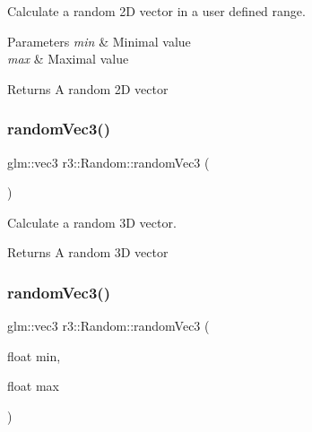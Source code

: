 Calculate a random 2D vector in a user defined range. 


\begin{DoxyParams}{Parameters}
{\em min} & Minimal value \\
\hline
{\em max} & Maximal value \\
\hline
\end{DoxyParams}
\begin{DoxyReturn}{Returns}
A random 2D vector 
\end{DoxyReturn}
\mbox{\label{classr3_1_1_random_a1819bc51a8924a8cbc4f8b2fc99d9a95}} 
\subsubsection{\texorpdfstring{random\+Vec3()}{randomVec3()}\hspace{0.1cm}{\footnotesize\ttfamily [1/3]}}
{\footnotesize\ttfamily glm\+::vec3 r3\+::\+Random\+::random\+Vec3 (\begin{DoxyParamCaption}{ }\end{DoxyParamCaption})\hspace{0.3cm}{\ttfamily [static]}}



Calculate a random 3D vector. 

\begin{DoxyReturn}{Returns}
A random 3D vector 
\end{DoxyReturn}
\mbox{\label{classr3_1_1_random_a85e5f280dcc4c84eea61bebb60b47d4a}} 
\subsubsection{\texorpdfstring{random\+Vec3()}{randomVec3()}\hspace{0.1cm}{\footnotesize\ttfamily [2/3]}}
{\footnotesize\ttfamily glm\+::vec3 r3\+::\+Random\+::random\+Vec3 (\begin{DoxyParamCaption}\item[{float}]{min,  }\item[{float}]{max }\end{DoxyParamCaption})\hspace{0.3cm}{\ttfamily [static]}}



